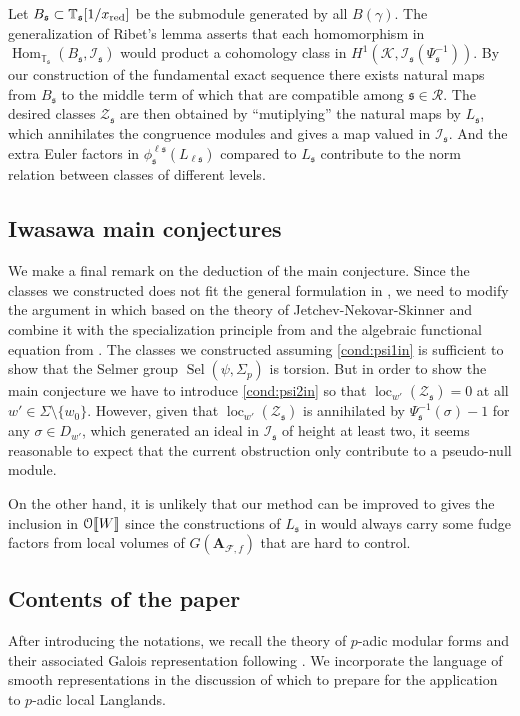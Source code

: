 \documentclass[leqno]{amsart}
\theoremstyle{definition}
\theoremstyle{remark}
\newcommand{\eo}{\EuScript{O}}
\newcommand{\A}{\mathbf A}
\DeclareMathOperator{\Hom}{Hom}
\newcommand{\fs}{\mathfrak{s}}
\newcommand{\xx}{x_\textnormal{red}}
\newcommand{\F}{{\mathcal{F}}} %
\newcommand{\K}{{\mathcal{K}}} %
\newcommand{\TT}{\mathbb{T}} %
\newcommand{\I}{\mathcal{I}} %
\DeclareMathOperator{\loc}{loc}
\DeclareMathOperator{\Sel}{Sel}
\begin{document}
Let $B_\fs\subset \TT_\fs[1/\xx]$
be the submodule generated by all $B(\gamma)$.
The generalization of Ribet's lemma asserts that
each homomorphism in $\Hom_{\TT_\fs}(B_\fs,\I_\fs)$
would product a cohomology class 
in $H^1(\K,\I_\fs(\Psi_\fs^{-1}))$.
By our construction of the fundamental exact sequence
there exists natural maps from $B_\fs$
to the middle term of which that are compatible
among $\fs\in\mathcal{R}$.
The desired classes $\mathcal{Z}_\fs$
are then obtained by ``mutiplying'' the natural maps
by $L_\fs$, which annihilates the congruence modules
and gives a map valued in $\I_\fs$.
And the extra Euler factors 
in $\phi^{\ell\fs}_\fs(L_{\ell\fs})$
compared to $L_\fs$ contribute to the 
norm relation between classes of different levels.

\subsection*{Iwasawa main conjectures}

We make a final remark on the deduction  of the main conjecture.
Since the classes we constructed does not fit the general
formulation in \cite{Rubin},
we need to modify the argument in which 
based on the theory of Jetchev-Nekovar-Skinner
and combine it with the specialization principle from \cite{Och05}
and the algebraic functional equation from \cite{Hsieh2010}.
The classes we constructed assuming \ref{cond:psi1in}
is sufficient to show that the Selmer group
$\Sel(\psi,\Sigma_p)$ is torsion.
But in order to show the main conjecture 
we have to introduce \ref{cond:psi2in}
so that $\loc_{w'}(\mathcal{Z}_\fs)=0$
at all $w'\in \Sigma\setminus\{w_0\}$.
However, given that 
$\loc_{w'}(\mathcal{Z}_\fs)$
is annihilated by $\Psi_\fs^{-1}(\sigma)-1$
for any $\sigma\in D_{w'}$, 
which generated an ideal in $\I_\fs$ of height at least two,
it seems reasonable to expect that the current
obstruction only contribute to a pseudo-null module.

On the other hand, it is unlikely that 
our method can be improved to gives
the inclusion in $\eo\llbracket W\rrbracket$
since the constructions of $L_\fs$ in \cite{lee}
would always carry some fudge factors from local volumes
of $G(\A_{\F,f})$ that are hard to control. 

\subsection*{Contents of the paper}
After introducing the notations, we recall the theory
of $p$-adic modular forms and their associated
Galois representation following \cite{ger}.
We incorporate the language of 
smooth representations in the discussion of which
to prepare for the application to $p$-adic local Langlands.
\end{document}
